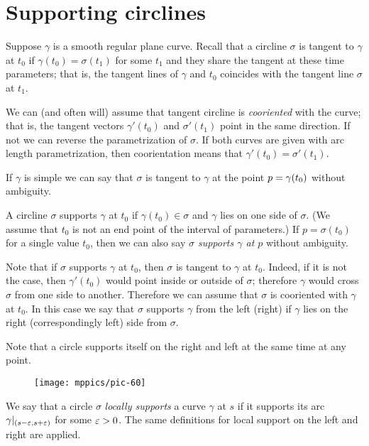 \section*{Supporting circlines}

Suppose $\gamma$ is a smooth regular plane curve.
Recall that a circline $\sigma$ is tangent to $\gamma$ at $t_0$ if
$\gamma(t_0)=\sigma(t_1)$ for some $t_1$ and they share the tangent at these time parameters;
that is, the tangent lines of $\gamma$ and $t_0$ coincides with the tangent line $\sigma$ at $t_1$.

We can (and often will) assume that tangent circline is \emph{cooriented} with the curve;
that is, the tangent vectors $\gamma'(t_0)$ and $\sigma'(t_1)$ point in the same direction.
If not we can reverse the parametrization of $\sigma$.
If both curves are given with arc length parametrization, then coorientation  means that $\gamma'(t_0)=\sigma'(t_1)$.

If $\gamma$ is simple we can say that $\sigma$ is tangent to $\gamma$ at the point $p\z=\gamma(t_0)$ without ambiguity.


A circline $\sigma$ supports $\gamma$ at $t_0$ if $\gamma(t_0)\in\sigma$
and $\gamma$ lies on one side of $\sigma$.
(We assume that $t_0$ is not an end point of the interval of parameters.)
If $p=\sigma(t_0)$ for a single value $t_0$,
then we can also say \emph{$\sigma$ supports $\gamma$ at $p$} without ambiguity.

Note that if $\sigma$ supports $\gamma$ at $t_0$, then $\sigma$ is tangent to $\gamma$ at $t_0$.
Indeed, if it is not the case, then $\gamma'(t_0)$ would point inside or outside of $\sigma$;
therefore $\gamma$ would cross $\sigma$ from one side to another.
Therefore we can assume that $\sigma$ is cooriented with $\gamma$  at $t_0$.
In this case we say that $\sigma$ supports $\gamma$ from the left (right) if $\gamma$ lies on the right (correspondingly left) side from $\sigma$. 


Note that a circle supports itself on the right and left at the same time at any point.

\begin{wrapfigure}{O}{43 mm}
\vskip0mm
\centering
\texttt{[image: mppics/pic-60]}
\vskip0mm
\end{wrapfigure}

We say that a circle $\sigma$ \emph{locally supports} a curve $\gamma$ at $s$
if it supports its arc $\gamma|_{(s-\varepsilon,s+\varepsilon)}$ for some $\varepsilon>0$.
The same definitions for local support on the left and right are applied.


